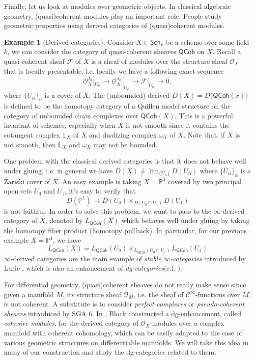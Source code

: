 \documentclass[12pt]{amsart}
\theoremstyle{definition}
\newtheorem{example}[thm]{Example}
\theoremstyle{remark}
\numberwithin{equation}{section}
\newcommand{\CP}{{\mathbb P}}
\newcommand{\CO}{{\mathcal O}}
\newcommand{\cinf}{{\mathcal C}^{\infty}}
\newcommand{\1}{{\mathbb{1}}}
\newcommand{\sch}{\mathsf{Sch}}
\newcommand{\QCoh}{\mathsf{QCoh}}
\newcommand{\Lx}{{\mathbb{L}}}
\begin{document}
Finally, let us look at modules over geometric objects. In classical algebraic geometry, (quasi)coherent modules play an important role. People study geometric properties using derived categories of (quasi)coherent modules.
\begin{example}[Derived categories]
    Consider $X\in \sch_k$ be a scheme over some field $k$, we can consider the category of quasi-coherent sheaves $\QCoh$ on $X$. Recall a quasi-coherent sheaf   $\mathcal{F}$ of $X$ is a sheaf of modules over the structure sheaf $\CO_X$ that is locally presentable, i.e. locally we have a following exact sequence
\begin{equation*}
\CO_X^{I_\alpha}|_{U_\alpha} \to \CO_X^{J_\alpha}|_{U_\alpha} \to \mathcal{F}|_{U_\alpha}\to 0,
\end{equation*}
where $\{{U_\alpha}\}_{\alpha}$ is a cover of $X$. The (unbounded) derived $D(X)=D\big(\QCoh(x)\big)$ is defined to be the homotopy category of a Quillen model structure on the category of unbounded chain complexes over $\QCoh(X)$. This is a powerful invariant of schemes, especially when $X$ is not smooth since it contains the cotangent complex $\Lx_X$ of $X$ and dualizing complex $\omega_X$ of $X$. Note that, if $X$ is not smooth, then $\Lx_X$ and $\omega_X$ may not be bounded.

One problem with the classical derived categories is that it does not behave well under gluing, i.e. in general we have $D(X) \not= \lim_{\{U_{\alpha}\}} D(U_{\alpha})$ where $\{U_{\alpha} \}_{\alpha}$ is a Zariski cover of $X$. An easy example is taking $X=\CP^1$ covered by two principal open sets $U_0$ and $U_1$, it's easy to verify that
\begin{equation*}
D(\CP^1) \to D(U_0) \times_{D(U_0\cap U_1)} D(U_1)
\end{equation*} 
is not faithful. In order to solve this problem, we want to pass to the $\infty$-derived category of $X$, denoted by $L_{\QCoh}(X)$ which behaves well under gluing by taking the homotopy fiber product (homotopy pullback). In particular, for our previous example $X=\CP^1$, we have
\begin{equation*}
L_{\QCoh}(X) = L_{\QCoh}(U_0)\times_{L_{\QCoh}(U_0 \cap U_1)} L_{\QCoh}(U_1)
\end{equation*}
$\infty$-derived categories are the main example of {\it stable $\infty$-categories} introduced by Lurie \cite{Lur06, Lur17}, which is also an enhancement of {\it dg-categories}(c.f. \cite{Kel06}).
\end{example}
For differential geometry, (quasi)coherent sheaves do not really make sense since given a manifold $M$, its structure sheaf $\CO_M$, i.e. the sheaf of $\cinf$-functions over $M$, is not coherent. A substitute is to consider {\it perfect complexes} or {\it pseudo-coherent sheaves} introduced by SGA 6\cite{Ber06}. In {\cite{Blo05}}, Block constructed a dg-enhancement, called {\it cohesive modules}, for the derived category of $\CO_X$-modules over a complex manifold with coherent cohomology, which can be easily adapted to the case of various geometric structures on differentiable manifolds. We will take this idea in many of our construction and study the dg-categories related to them.
\end{document}
